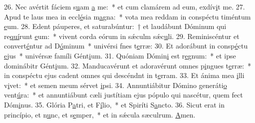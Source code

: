 26. Nec avértit fáciem s\uline{u}am \uline{a} me:~* et cum clamárem ad eum, exdív\uline{i}t me.
27. Apud te laus mea in eccl\uline{é}sia m\uline{a}gna:~* vota mea reddam in conspéctu timéntum \uline{e}um.
28. Edent páuperes, et saturabúntur:~† et laudábunt Dóminum qui re\uline{quí}runt \uline{e}um:~* vivent corda eórum in sǽculm sǽc\uline{u}li.
29. Reminiscéntur et convert\uline{é}ntur ad D\uline{ó}minum~* univérsi fnes t\uline{e}rræ:
30. Et adorábunt in consp\uline{é}ctu \uline{e}jus~* univérsæ famíli Gént\uline{i}um.
31. Quóniam Dómin\uline{i} est r\uline{e}gnum:~* et ipse dominábitr Gént\uline{i}um.
32. Manducavérunt et adoravérunt omnes p\uline{i}ngues t\uline{e}rræ:~* in conspéctu ejus cadent omnes qui descéndnt in t\uline{e}rram.
33. Et ánima mea \uline{i}lli v\uline{i}vet:~* et semen meum sérvet \uline{i}psi.
34. Annuntiábitur Dómino generáti\uline{o} vent\uline{ú}ra:~* et annuntiábunt cæli justítiam ejus pópulo qui nascétur, quem fect Dóm\uline{i}nus.
35. Glória P\uline{a}tri, et F\uline{í}lio,~* et Spiríti S\uline{a}ncto.
36. Sicut erat in princípio, et n\uline{u}nc, et s\uline{e}mper,~* et in sǽcula sæculrum. \uline{A}men.
